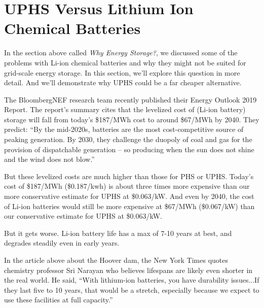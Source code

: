 \documentclass[hidelinks,12pt,a4paper]{article}
\begin{document}
\pagebreak[4]
\section{UPHS Versus Lithium Ion Chemical Batteries}
In the section above called \textit{Why Energy Storage?}, we discussed some of the problems with Li-ion chemical batteries and why they might not be suited for grid-scale energy storage. In this section, we'll explore this question in more detail. And we'll demonstrate why UPHS could be a far cheaper alternative.

The BloombergNEF research team recently published their Energy Outlook 2019 Report. The report's summary cites that the levelized cost of (Li-ion battery) storage will fall from today's \$187/MWh cost to around \$67/MWh by 2040. \cite{NewEnergyOutlook2019Report} They predict: “By the mid-2020s, batteries are the most cost-competitive source of peaking generation. By 2030, they challenge the duopoly of coal and gas for the provision of dispatchable generation – so producing when the sun does not shine and the wind does not blow.” \cite{NewEnergyOutlook2019Report}

But these levelized costs are much higher than those for PHS or UPHS.
Today's cost of \$187/MWh (\$0.187/kwh) is about three times more expensive than our more conservative estimate for UPHS at \$0.063/kW. And even by 2040, the cost of Li-ion batteries would still be more expensive at \$67/MWh (\$0.067/kW) than our conservative estimate for UPHS at \$0.063/kW.

But it gets worse. Li-ion battery life has a max of 7-10 years at best, and degrades steadily even in early years. \cite{LifePredictionModelForLiIonBattery}

In the article above about the Hoover dam, the New York Times quotes chemistry professor Sri Narayan who believes lifespans are likely even shorter in the real world. He said, “With lithium-ion batteries, you have durability issues...If they last five to 10 years, that would be a stretch, especially because we expect to use these facilities at full capacity.” \cite{The3BillionPlanToTurnHooverDamIntoAGiantBattery}
\end{document}
